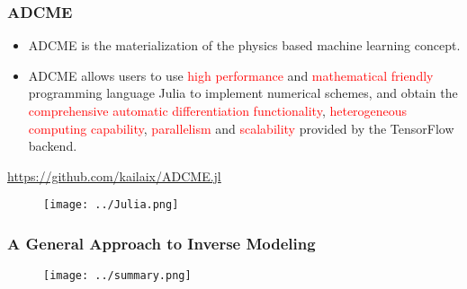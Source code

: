\documentclass[usenames,dvipsnames]{beamer}
\begin{document}
\begin{frame}
	\frametitle{ADCME}
	\begin{itemize}
	\item ADCME is the materialization of the physics based machine learning concept. 
		\item ADCME allows users to use \textcolor{red}{high performance} and \textcolor{red}{mathematical friendly} programming language Julia to implement numerical schemes, and obtain the \textcolor{red}{comprehensive automatic differentiation functionality}, \textcolor{red}{heterogeneous computing capability}, \textcolor{red}{parallelism} and \textcolor{red}{scalability} provided by the TensorFlow backend. 
	\end{itemize}
	\begin{center}
		\url{https://github.com/kailaix/ADCME.jl}
	\end{center}
	\vspace{-0.3cm}
	\begin{figure}[hbt]
  \texttt{[image: ../Julia.png]}
\end{figure}
\end{frame}

\begin{frame}
	\frametitle{A General Approach to Inverse Modeling}
	\begin{figure}[hbt]
  \texttt{[image: ../summary.png]}
\end{figure}
%
\end{frame}


\end{document}
